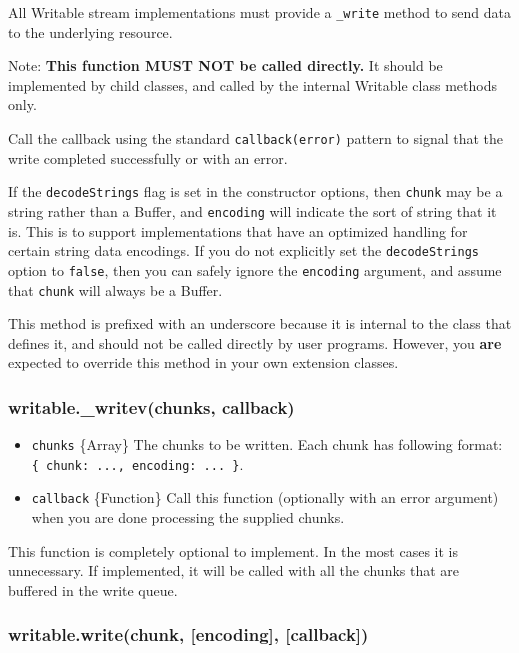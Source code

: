 All Writable stream implementations must provide a \texttt{\_write}
method to send data to the underlying resource.

Note: \textbf{This function MUST NOT be called directly.} It should be
implemented by child classes, and called by the internal Writable class
methods only.

Call the callback using the standard \texttt{callback(error)} pattern to
signal that the write completed successfully or with an error.

If the \texttt{decodeStrings} flag is set in the constructor options,
then \texttt{chunk} may be a string rather than a Buffer, and
\texttt{encoding} will indicate the sort of string that it is. This is
to support implementations that have an optimized handling for certain
string data encodings. If you do not explicitly set the
\texttt{decodeStrings} option to \texttt{false}, then you can safely
ignore the \texttt{encoding} argument, and assume that \texttt{chunk}
will always be a Buffer.

This method is prefixed with an underscore because it is internal to the
class that defines it, and should not be called directly by user
programs. However, you \textbf{are} expected to override this method in
your own extension classes.

\subsubsection{writable.\_writev(chunks, callback)}

\begin{itemize}
\item
  \texttt{chunks} \{Array\} The chunks to be written. Each chunk has
  following format: \texttt{\{ chunk: ..., encoding: ... \}}.
\item
  \texttt{callback} \{Function\} Call this function (optionally with an
  error argument) when you are done processing the supplied chunks.
\end{itemize}

This function is completely optional to implement. In the most cases it
is unnecessary. If implemented, it will be called with all the chunks
that are buffered in the write queue.

\subsubsection{writable.write(chunk, {[}encoding{]}, {[}callback{]})}

